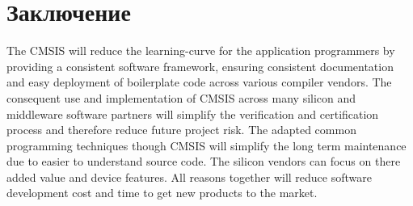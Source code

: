 \section{Заключение}

The CMSIS will reduce the learning-curve for the application programmers by
providing a consistent software framework, ensuring consistent documentation and
easy deployment of boilerplate code across various compiler vendors. The
consequent use and implementation of CMSIS across many silicon and middleware
software partners will simplify the verification and certification process and
therefore reduce future project risk. The adapted common programming techniques
though CMSIS will simplify the long term maintenance due to easier to understand
source code. The silicon vendors can focus on there added value and device
features. All reasons together will reduce software development cost and time to
get new products to the market.
